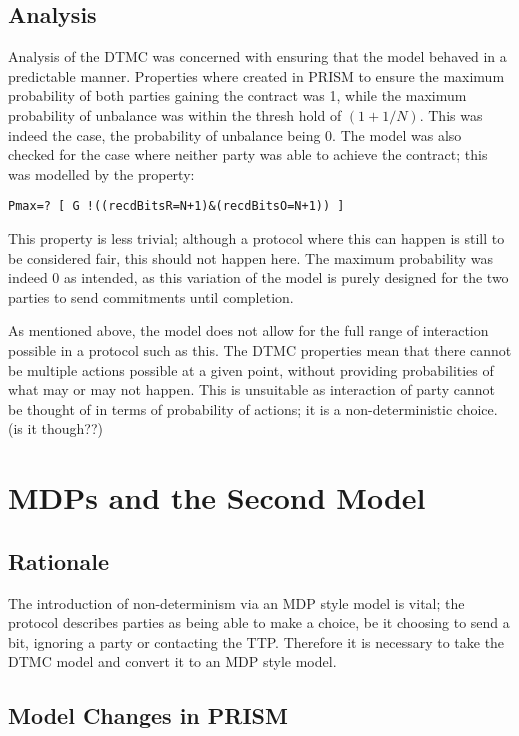 \documentclass{l4proj}
\begin{document}
\section{Analysis}

Analysis of the DTMC was concerned with ensuring that the model behaved in a predictable manner. Properties where created in PRISM to ensure the maximum probability of both parties gaining the contract was 1, while the maximum probability of unbalance was within the thresh hold of $(1+1/N)$. This was indeed the case, the probability of unbalance being 0. The model was also checked for the case where neither party was able to achieve the contract; this was modelled by the property:
\begin{lstlisting}
Pmax=? [ G !((recdBitsR=N+1)&(recdBitsO=N+1)) ]
\end{lstlisting}
This property is less trivial; although a protocol where this can happen is still to be considered fair, this should not happen here. The maximum probability was indeed 0 as intended, as this variation of the model is purely designed for the two parties to send commitments until completion.

As mentioned above, the model does not allow for the full range of interaction possible in a protocol such as this. The DTMC properties mean that there cannot be multiple actions possible at a given point, without providing probabilities of what may or may not happen. This is unsuitable as interaction of party cannot be thought of in terms of probability of actions; it is a non-deterministic choice. (is it though??) 
\chapter{MDPs and the Second Model}

\section{Rationale}
The introduction of non-determinism via an MDP style model is vital; the protocol describes parties as being able to make a choice, be it choosing to send a bit, ignoring a party or contacting the TTP. Therefore it is necessary to take the DTMC model and convert it to an MDP style model. 


\section{Model Changes in PRISM}
\end{document}
